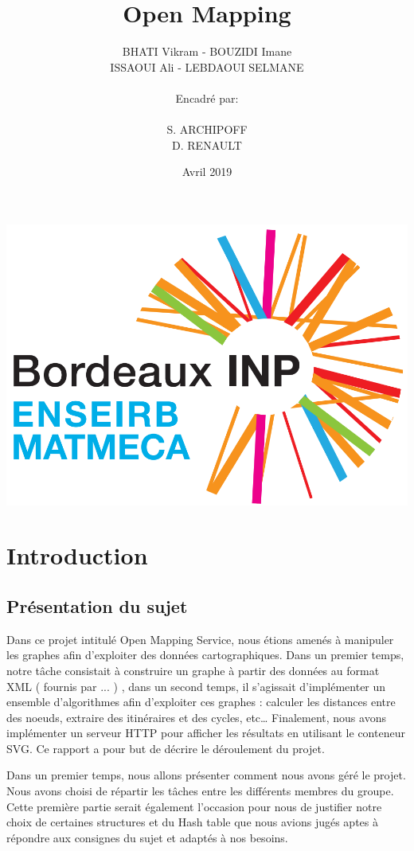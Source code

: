 \documentclass[french]{article}
\title{ \Huge \textbf{Open Mapping}}
\author{ BHATI Vikram - BOUZIDI Imane \\ ISSAOUI Ali - LEBDAOUI SELMANE \\ 
     \\ Encadré par: \\ \\ S. ARCHIPOFF \\ D. RENAULT}
\date{Avril 2019}
\begin{document}
\maketitle
\begin{center}
\includegraphics[scale=0.40]{enseirb.png}
\end{center}

\newpage

\tableofcontents

\newpage

\section{Introduction}
\subsection{Présentation du sujet} %


Dans ce projet intitulé Open Mapping Service, nous étions amenés à manipuler les graphes afin d’exploiter des données cartographiques. Dans un premier temps, notre tâche consistait à construire un graphe à partir des données au format XML ( fournis par ... ) , dans un second temps, il s’agissait d’implémenter un ensemble d’algorithmes afin d’exploiter ces graphes : calculer les distances entre des noeuds, extraire des itinéraires et des cycles, etc… Finalement, nous avons implémenter un serveur HTTP pour afficher les résultats en utilisant le conteneur SVG. Ce rapport a pour but de décrire le déroulement du projet. \newline

Dans un premier temps, nous allons présenter comment nous avons géré le projet. Nous avons choisi de répartir les tâches entre les différents membres du groupe. Cette première partie serait également l’occasion pour nous de justifier notre choix de certaines structures et du Hash table que nous avions jugés aptes à répondre aux consignes du sujet et adaptés à nos besoins. \newline
\end{document}
